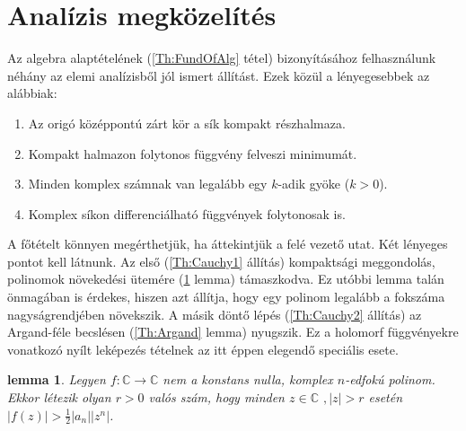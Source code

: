 \documentclass[9pt, showtrims]{memoir}
\theoremstyle{plain}
\newtheorem{lemma}[proposition]{lemma}
\theoremstyle{remark}
\theoremstyle{definition}
\begin{document}
\section{Analízis megközelítés}
Az algebra alaptételének (\ref{Th:FundOfAlg} tétel) bizonyításához felhasználunk néhány az elemi analízisből
jól ismert állítást.
Ezek közül a lényegesebbek az alábbiak:
\begin{enumerate}
\item  Az origó középpontú zárt kör a sík
kompakt részhalmaza.

\item  Kompakt halmazon folytonos függvény felveszi minimumát.

\item  Minden komplex számnak van legalább egy $k$-adik gyöke ($k>0$).

\item  Komplex síkon differenciálható függvények
folytonosak is.
\end{enumerate}

A főtételt könnyen megérthetjük, ha áttekintjük
a felé vezető utat.
Két lényeges pontot kell látnunk.
Az első (\ref{Th:Cauchy1} állítás) kompaktsági meggondolás, polinomok növekedési ütemére (\ref{Th:Grow} lemma) támaszkodva.
Ez utóbbi lemma talán önmagában is érdekes, hiszen azt állítja, hogy egy polinom legalább a fokszáma nagyságrendjében növekszik.
A másik döntő lépés (\ref{Th:Cauchy2} állítás) az Argand-féle becslésen (\ref{Th:Argand} lemma) nyugszik.
Ez a holomorf függvényekre vonatkozó nyílt leképezés tételnek az itt éppen elegendő speciális esete.

\begin{lemma}
\label{Th:Grow}Legyen $f:\mathbb{C}\rightarrow \mathbb{C}$ nem a konstans nulla,
komplex $n$-edfokú polinom.
Ekkor létezik olyan $r>0$ valós szám, hogy minden $z\in \mathbb{C}$ $,\left| z\right| >r$ esetén $\left| f\left( z\right) \right| >\frac{1}{2}\left| a_{n}\right| \left|
z^{n}\right| $.
\end{lemma}
\end{document}
